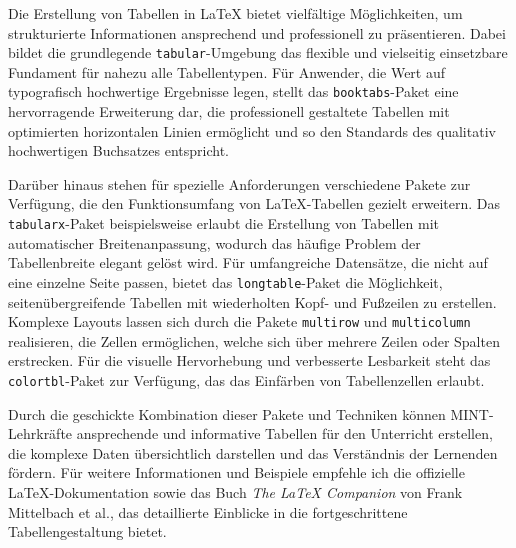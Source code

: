 \documentclass[12pt,a4paper]{article}
\begin{document}
Die Erstellung von Tabellen in LaTeX bietet vielfältige Möglichkeiten, um strukturierte Informationen ansprechend und professionell zu präsentieren. Dabei bildet die grundlegende \texttt{tabular}-Umgebung das flexible und vielseitig einsetzbare Fundament für nahezu alle Tabellentypen. Für Anwender, die Wert auf typografisch hochwertige Ergebnisse legen, stellt das \texttt{booktabs}-Paket eine hervorragende Erweiterung dar, die professionell gestaltete Tabellen mit optimierten horizontalen Linien ermöglicht und so den Standards des qualitativ hochwertigen Buchsatzes entspricht.

Darüber hinaus stehen für spezielle Anforderungen verschiedene Pakete zur Verfügung, die den Funktionsumfang von LaTeX-Tabellen gezielt erweitern. Das \texttt{tabularx}-Paket beispielsweise erlaubt die Erstellung von Tabellen mit automatischer Breitenanpassung, wodurch das häufige Problem der Tabellenbreite elegant gelöst wird. Für umfangreiche Datensätze, die nicht auf eine einzelne Seite passen, bietet das \texttt{longtable}-Paket die Möglichkeit, seitenübergreifende Tabellen mit wiederholten Kopf- und Fußzeilen zu erstellen. Komplexe Layouts lassen sich durch die Pakete \texttt{multirow} und \texttt{multicolumn} realisieren, die Zellen ermöglichen, welche sich über mehrere Zeilen oder Spalten erstrecken. Für die visuelle Hervorhebung und verbesserte Lesbarkeit steht das \texttt{colortbl}-Paket zur Verfügung, das das Einfärben von Tabellenzellen erlaubt.

Durch die geschickte Kombination dieser Pakete und Techniken können MINT-Lehrkräfte ansprechende und informative Tabellen für den Unterricht erstellen, die komplexe Daten übersichtlich darstellen und das Verständnis der Lernenden fördern. Für weitere Informationen und Beispiele empfehle ich die offizielle LaTeX-Dokumentation sowie das Buch \textit{The LaTeX Companion} von Frank Mittelbach et al., das detaillierte Einblicke in die fortgeschrittene Tabellengestaltung bietet.
\end{document}
